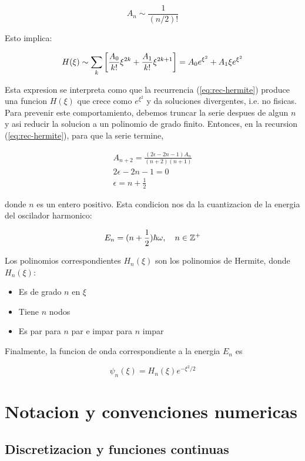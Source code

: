 \documentclass[11pt]{article}
\begin{document}
\[ A_n \sim \frac{1}{(n/2)!} \]

Esto implica:

\[ H(\xi) \sim \sum_k \qty[\frac{A_0}{k!}\xi^{2k} + \frac{A_1}{k!}\xi^{2k+1}] = A_0e^{\xi^2} + A_1\xi e^{\xi^2} \]

Esta expresion se interpreta como que la recurrencia (\ref{eq:rec-hermite}) produce una funcion \(H(\xi)\) que crece como \(e^{\xi^2}\) y da soluciones divergentes, i.e. no fisicas. Para prevenir este comportamiento, debemos truncar la serie despues de algun \(n\) y asi reducir la solucion a un polinomio de grado finito. Entonces, en la recursion (\ref{eq:rec-hermite}), para que la serie termine,

\begin{gather*}
      A_{n+2} = \frac{(2\epsilon - 2n -1)A_n}{(n+2)(n+1)} \\
      2\epsilon - 2n -1 = 0 \\
      \epsilon = n + \frac{1}{2}
\end{gather*}

donde \(n\) es un entero positivo. Esta condicion nos da la cuantizacion de la energia del oscilador harmonico:

\begin{equation}
\label{eq:ho-energy}
    E_n = (n+\frac{1}{2})\hbar \omega \qc n \in \mathbb{Z}^+
\end{equation}

Los polinomios correspondientes \(H_n(\xi)\) son los polinomios de Hermite, donde \(H_n(\xi)\):

\begin{itemize}
\item Es de grado \(n\) en \(\xi\)

\item Tiene \(n\) nodos

\item Es par para \(n\) par e impar para \(n\) impar
\end{itemize}

Finalmente, la funcion de onda correspondiente a la energia \(E_n\) es

\[ \psi_n(\xi) = H_n(\xi)e^{-\xi^2/2} \]
\section{Notacion y convenciones numericas}
\label{sec:org2ae4a3d}

\subsection{Discretizacion y funciones continuas}
\label{sec:orgadc74eb}
\end{document}
